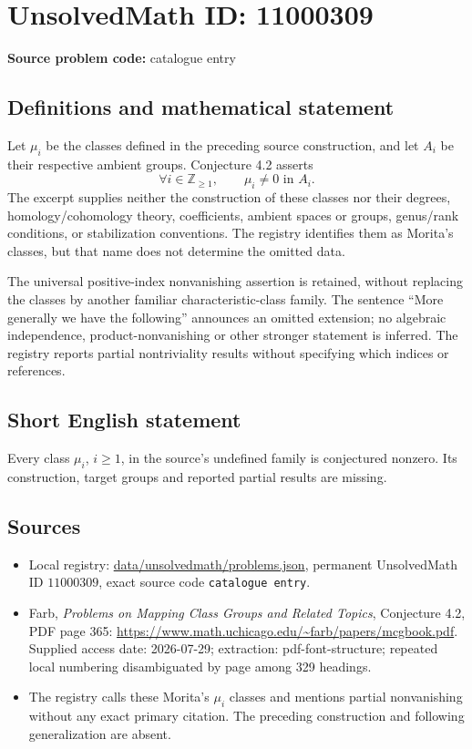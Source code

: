 \documentclass[11pt]{article}
\newcommand{\Z}{\mathbb{Z}}
\begin{document}
\section*{UnsolvedMath ID: 11000309}
\textbf{Source problem code:} catalogue entry
\subsection{Definitions and mathematical statement}
Let $\mu_i$ be the classes defined in the preceding source construction, and let $A_i$ be their respective ambient groups. Conjecture 4.2 asserts
\[
 \forall i\in\Z_{\geq1},\qquad\mu_i\ne0\text{ in }A_i.
\]
The excerpt supplies neither the construction of these classes nor their degrees, homology/cohomology theory, coefficients, ambient spaces or groups, genus/rank conditions, or stabilization conventions. The registry identifies them as Morita's classes, but that name does not determine the omitted data.

The universal positive-index nonvanishing assertion is retained, without replacing the classes by another familiar characteristic-class family. The sentence ``More generally we have the following'' announces an omitted extension; no algebraic independence, product-nonvanishing or other stronger statement is inferred. The registry reports partial nontriviality results without specifying which indices or references.
\subsection{Short English statement}
Every class $\mu_i$, $i\geq1$, in the source's undefined family is conjectured nonzero. Its construction, target groups and reported partial results are missing.
\subsection{Sources}
\begin{itemize}
\item Local registry: \url{data/unsolvedmath/problems.json}, permanent UnsolvedMath ID $11000309$, exact source code \texttt{catalogue entry}.
\item Farb, \emph{Problems on Mapping Class Groups and Related Topics}, Conjecture 4.2, PDF page 365: \url{https://www.math.uchicago.edu/~farb/papers/mcgbook.pdf}. Supplied access date: 2026-07-29; extraction: pdf-font-structure; repeated local numbering disambiguated by page among 329 headings.
\item The registry calls these Morita's $\mu_i$ classes and mentions partial nonvanishing without any exact primary citation. The preceding construction and following generalization are absent.
\end{itemize}
\end{document}
